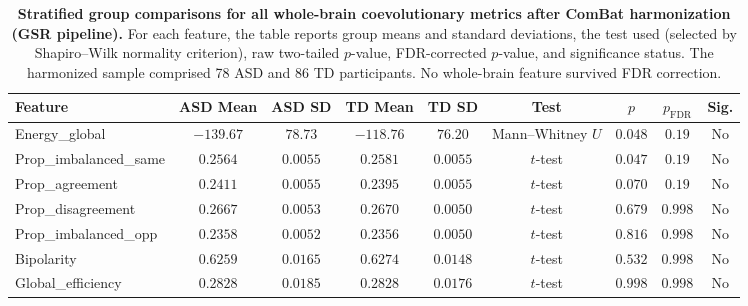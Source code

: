\documentclass[10pt,letterpaper]{article}
\begin{document}
\begin{table}[htbp]
\centering
\caption{\textbf{Stratified group comparisons for all whole-brain coevolutionary metrics after
ComBat harmonization (GSR pipeline).} For each feature, the table reports group means and standard
deviations, the test used (selected by Shapiro--Wilk normality criterion), raw two-tailed $p$-value,
FDR-corrected $p$-value, and significance status. The harmonized sample comprised 78 ASD and 86 TD
participants. No whole-brain feature survived FDR correction.}
\label{tab:supp_whole_stats}
\scriptsize
\begin{tabular}{lcccccccc}
\toprule
\textbf{Feature} & \textbf{ASD Mean} & \textbf{ASD SD} & \textbf{TD Mean} & \textbf{TD SD} & \textbf{Test} & \textbf{$p$} & \textbf{$p_{\mathrm{FDR}}$} & \textbf{Sig.} \\
\midrule
Energy\_global 
  & $-139.67$ & $78.73$ 
  & $-118.76$ & $76.20$ 
  & Mann--Whitney $U$ 
  & $0.048$ & $0.19$ & No \\
Prop\_imbalanced\_same 
  & $0.2564$ & $0.0055$ 
  & $0.2581$ & $0.0055$ 
  & $t$-test 
  & $0.047$ & $0.19$ & No \\
Prop\_agreement 
  & $0.2411$ & $0.0055$ 
  & $0.2395$ & $0.0055$ 
  & $t$-test 
  & $0.070$ & $0.19$ & No \\
Prop\_disagreement 
  & $0.2667$ & $0.0053$ 
  & $0.2670$ & $0.0050$ 
  & $t$-test 
  & $0.679$ & $0.998$ & No \\
Prop\_imbalanced\_opp 
  & $0.2358$ & $0.0052$ 
  & $0.2356$ & $0.0050$ 
  & $t$-test 
  & $0.816$ & $0.998$ & No \\
Bipolarity 
  & $0.6259$ & $0.0165$ 
  & $0.6274$ & $0.0148$ 
  & $t$-test 
  & $0.532$ & $0.998$ & No \\
Global\_efficiency 
  & $0.2828$ & $0.0185$ 
  & $0.2828$ & $0.0176$ 
  & $t$-test 
  & $0.998$ & $0.998$ & No \\
\bottomrule
\end{tabular}
\end{table}
\end{document}
